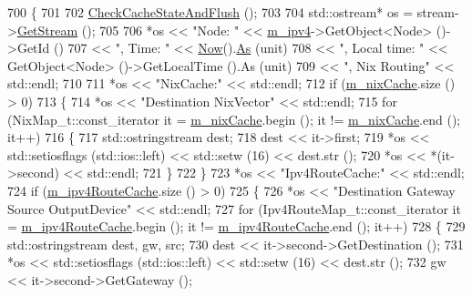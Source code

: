 \begin{DoxyCode}
700 \{
701 
702   \hyperlink{classns3_1_1Ipv4NixVectorRouting_aeeafd72dfb17da8349627232c9e9984f}{CheckCacheStateAndFlush} ();
703 
704   std::ostream* os = stream->\hyperlink{classns3_1_1OutputStreamWrapper_a0cf30a4188ab6fdae2b2ab74db11acc2}{GetStream} ();
705 
706   *os << \textcolor{stringliteral}{"Node: "} << \hyperlink{classns3_1_1Ipv4NixVectorRouting_a215cb71f30d85df9ec7176ca22620519}{m\_ipv4}->GetObject<Node> ()->GetId ()
707       << \textcolor{stringliteral}{", Time: "} << \hyperlink{group__simulator_gac3635e2e87f7ce316c89290ee1b01d0d}{Now}().\hyperlink{classns3_1_1Time_a0bb1110638ce9938248bd07865a328ab}{As} (unit)
708       << \textcolor{stringliteral}{", Local time: "} << GetObject<Node> ()->GetLocalTime ().As (unit)
709       << \textcolor{stringliteral}{", Nix Routing"} << std::endl;
710 
711   *os << \textcolor{stringliteral}{"NixCache:"} << std::endl;
712   \textcolor{keywordflow}{if} (\hyperlink{classns3_1_1Ipv4NixVectorRouting_a394e830e592aa6ef064be362150219f2}{m\_nixCache}.size () > 0)
713     \{
714       *os << \textcolor{stringliteral}{"Destination     NixVector"} << std::endl;
715       \textcolor{keywordflow}{for} (NixMap\_t::const\_iterator it = \hyperlink{classns3_1_1Ipv4NixVectorRouting_a394e830e592aa6ef064be362150219f2}{m\_nixCache}.begin (); it != 
      \hyperlink{classns3_1_1Ipv4NixVectorRouting_a394e830e592aa6ef064be362150219f2}{m\_nixCache}.end (); it++)
716         \{
717           std::ostringstream dest;
718           dest << it->first;
719           *os << std::setiosflags (std::ios::left) << std::setw (16) << dest.str ();
720           *os << *(it->second) << std::endl;
721         \}
722     \}
723   *os << \textcolor{stringliteral}{"Ipv4RouteCache:"} << std::endl;
724   \textcolor{keywordflow}{if} (\hyperlink{classns3_1_1Ipv4NixVectorRouting_aeb85361b66489c60851f72f1493fdee7}{m\_ipv4RouteCache}.size () > 0)
725     \{
726       *os << \textcolor{stringliteral}{"Destination     Gateway         Source            OutputDevice"} << std::endl;
727       \textcolor{keywordflow}{for} (Ipv4RouteMap\_t::const\_iterator it = \hyperlink{classns3_1_1Ipv4NixVectorRouting_aeb85361b66489c60851f72f1493fdee7}{m\_ipv4RouteCache}.begin (); it != 
      \hyperlink{classns3_1_1Ipv4NixVectorRouting_aeb85361b66489c60851f72f1493fdee7}{m\_ipv4RouteCache}.end (); it++)
728         \{
729           std::ostringstream dest, gw, src;
730           dest << it->second->GetDestination ();
731           *os << std::setiosflags (std::ios::left) << std::setw (16) << dest.str ();
732           gw << it->second->GetGateway ();

\end{DoxyCode}
